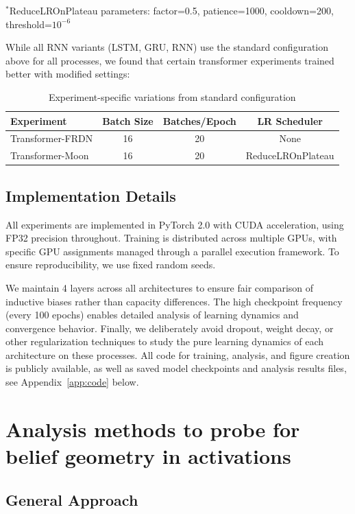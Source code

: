 \documentclass[prx,nofootinbib,onecolumn,showkeys,groupaddress,preprintnumbers,floatfix,
superscriptaddress]{revtex4-1}
\begin{document}
\noindent $^*$ReduceLROnPlateau parameters: factor=0.5, patience=1000, cooldown=200, threshold=$10^{-6}$

While all RNN variants (LSTM, GRU, RNN) use the standard configuration above for all processes, we found that certain transformer experiments trained better with modified settings:

\begin{table}[h]
\centering
\caption{Experiment-specific variations from standard configuration}
\label{tab:variations}
\begin{tabular}{lccc}
\toprule
\textbf{Experiment} & \textbf{Batch Size} & \textbf{Batches/Epoch} & \textbf{LR Scheduler} \\
\midrule
Transformer-FRDN & 16 & 20 & None \\
Transformer-Moon & 16 & 20 & ReduceLROnPlateau \\
\bottomrule
\end{tabular}
\end{table}

\subsection{Implementation Details}

All experiments are implemented in PyTorch 2.0 with CUDA acceleration, using FP32 precision throughout. Training is distributed across multiple GPUs, with specific GPU assignments managed through a parallel execution framework. To ensure reproducibility, we use fixed random seeds.

 We maintain 4 layers across all architectures to ensure fair comparison of inductive biases rather than capacity differences. The high checkpoint frequency (every 100 epochs) enables detailed analysis of learning dynamics and convergence behavior. Finally, we deliberately avoid dropout, weight decay, or other regularization techniques to study the pure learning dynamics of each architecture on these processes. All code for training, analysis, and figure creation is publicly available, as well as saved model checkpoints and analysis results files, see Appendix~\ref{app:code} below.

\section{Analysis methods to probe for belief geometry in activations}
\label{app:methods-probe-beliefs}

\subsection{General Approach}
\label{app:LinRegression}
\end{document}
